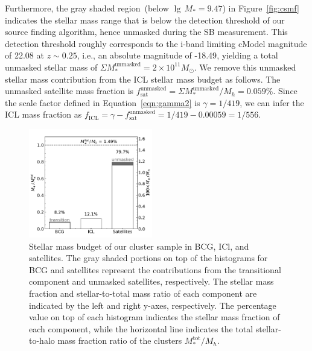 \documentclass[fleqn,usenatbib]{mnras}
\newcommand{\msol}{M_{\odot}}
\newcommand\xkchen[1]{{\color{cyan} {#1}}}
\begin{document}
Furthermore, the gray shaded region~(below \xkchen{$\lg\,M_*{=}9.47$}) in
Figure~\ref{fig:csmf} indicates the stellar mass range that is below the
detection threshold of our source finding algorithm, hence unmasked during
the SB measurement.  This detection threshold roughly corresponds to the
i-band limiting cModel magnitude of \xkchen{22.08} at \xkchen{$z\sim0.25$}, i.e., an absolute
magnitude of \xkchen{-18.49}, yielding a total unmasked stellar mass of $\Sigma
M_*^{\mathrm{unmasked}}{=}2\times10^{11}\msol$.  We remove this unmasked
stellar mass contribution from the ICL stellar mass budget as follows.  The
unmasked satellite mass fraction is
\xkchen{$f^{\mathrm{unmasked}}_{\mathrm{sat}}=\Sigma
M_*^{\mathrm{unmasked}}/M_h=0.059\%$}. Since the scale factor defined in
Equation~\ref{eqn:gamma2} is \xkchen{$\gamma=1/419$}, we can infer the ICL mass
fraction as \xkchen{$f_{\mathrm{ICL}}=\gamma -
f^{\mathrm{unmasked}}_{\mathrm{sat}}= 1/419 - 0.00059 = 1/556$}.


\begin{figure}
    \includegraphics[width=0.48\textwidth]{fig/ICL_star_mass_fraction.pdf}
    \caption{Stellar mass budget of our cluster sample in BCG, ICl, and
    satellites. The gray shaded portions on top of the histograms for BCG
    and satellites represent the contributions from the transitional
    component and unmasked satellites, respectively. The stellar mass
    fraction and stellar-to-total mass ratio of each component are
    indicated by the left and right y-axes, respectively. The percentage
    value on top of each histogram indicates the stellar mass fraction of
    each component, while the horizontal line indicates the total
    stellar-to-halo mass fraction ratio of the clusters
    $M_*^{\mathrm{tot}}/M_h$.\label{fig:budget} }
\end{figure}
\end{document}
